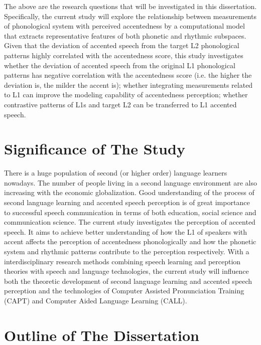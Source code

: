 The above are the research questions that will be investigated in this dissertation. Specifically, the current study will explore the relationship between measurements of phonological system with perceived accentedness by a computational model that extracts representative features of both phonetic and rhythmic subspaces. Given that the deviation of accented speech from the target L2 phonological patterns highly correlated with the accentedness score, this study investigates whether the deviation of accented speech from the original L1 phonological patterns has negative correlation with the accentedness score (i.e. the higher the deviation is, the milder the accent is); whether integrating measurements related to L1 can improve the modeling capability of accentedness perception; whether contrastive patterns of L1s and target L2 can be transferred to L1 accented speech.

\section{Significance of The Study}

There is a huge population of second (or higher order) language learners nowadays. The number of people living in a second language environment are also increasing with the economic globalization. Good understanding of the process of second language learning and accented speech perception is of great importance to successful speech communication in terms of both education, social science and communication science. The current study investigates the perception of accented speech. It aims to achieve better understanding of how the L1 of speakers with accent affects the perception of accentedness phonologically and how the phonetic system and rhythmic patterns contribute to the perception respectively. With a interdisciplinary research methods combining speech learning and perception theories with speech and language technologies, the current study will influence both the theoretic development of second language learning and accented speech perception and the technologies of Computer Assisted Pronunciation Training (CAPT) and Computer Aided Language Learning (CALL).

\section{Outline of The Dissertation}

